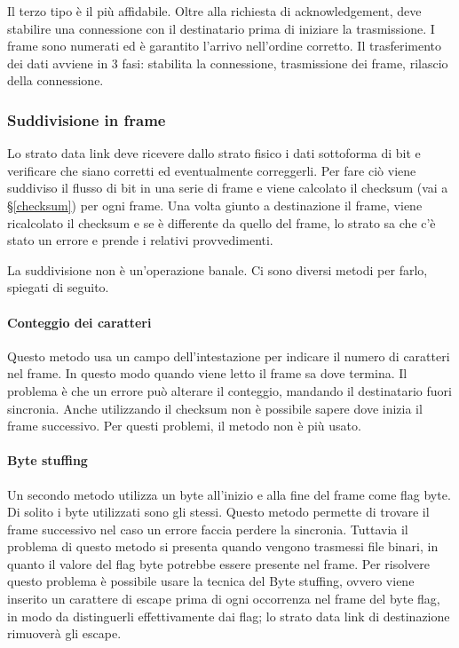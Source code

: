 Il terzo tipo è il più affidabile. Oltre alla richiesta di acknowledgement, deve stabilire una connessione con il destinatario prima di iniziare la trasmissione.
I frame sono numerati ed è garantito l'arrivo nell'ordine corretto.
Il trasferimento dei dati avviene in 3 fasi: stabilita la connessione, trasmissione dei frame, rilascio della connessione. 

\subsubsection{Suddivisione in frame}
Lo strato data link deve ricevere dallo strato fisico i dati sottoforma di bit e verificare che siano corretti ed eventualmente correggerli.
Per fare ciò viene suddiviso il flusso di bit in una serie di frame e viene calcolato il checksum (vai a §\ref{checksum}) per ogni frame.
Una volta giunto a destinazione il frame, viene ricalcolato il checksum e se è differente da quello del frame, lo strato sa che c'è stato un errore e prende i relativi provvedimenti.

La suddivisione non è un'operazione banale. Ci sono diversi metodi per farlo, spiegati di seguito.

\paragraph{Conteggio dei caratteri}
Questo metodo usa un campo dell'intestazione per indicare il numero di caratteri nel frame.
In questo modo quando viene letto il frame sa dove termina.
Il problema è che un errore può alterare il conteggio, mandando il destinatario fuori sincronia.
Anche utilizzando il checksum non è possibile sapere dove inizia il frame successivo.
Per questi problemi, il metodo non è più usato.

\paragraph{Byte stuffing}
Un secondo metodo utilizza un byte all'inizio e alla fine del frame come flag byte.
Di solito i byte utilizzati sono gli stessi.
Questo metodo permette di trovare il frame successivo nel caso un errore faccia perdere la sincronia.
Tuttavia il problema di questo metodo si presenta quando vengono trasmessi file binari, in quanto il valore del flag byte potrebbe essere presente nel frame.
Per risolvere questo problema è possibile usare la tecnica del Byte stuffing,
ovvero viene inserito un carattere di escape prima di ogni occorrenza nel frame del byte flag, in modo da distinguerli effettivamente dai flag;
lo strato data link di destinazione rimuoverà gli escape.

